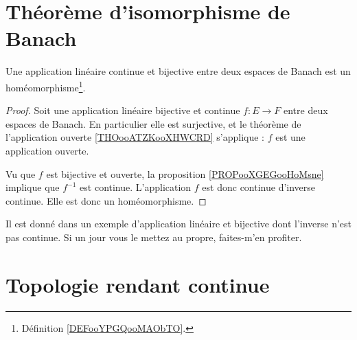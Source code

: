 

\section{Théorème d'isomorphisme de Banach}

\begin{theorem}  \label{ThofQShsw}
    Une application linéaire continue et bijective entre deux espaces de Banach est un homéomorphisme\footnote{Définition \ref{DEFooYPGQooMAObTO}.}.
\end{theorem}

\begin{proof}
    Soit une application linéaire bijective et continue \( f\colon E\to F\) entre deux espaces de Banach. En particulier elle est surjective, et le théorème de l'application ouverte \ref{THOooATZKooXHWCRD} s'applique : \( f\) est une application ouverte.

    Vu que \( f\) est bijective et ouverte, la proposition \ref{PROPooXGEGooHoMsne} implique que \( f^{-1}\) est continue. L'application \( f\) est donc continue d'inverse continue. Elle est donc un homéomorphisme.
\end{proof}

\begin{probleme}
    Il est donné dans \cite{BIBooQRUCooMqayTg} un exemple d'application linéaire et bijective dont l'inverse n'est pas continue. Si un jour vous le mettez au propre, faites-m'en profiter.
\end{probleme}

\section{Topologie rendant continue}

